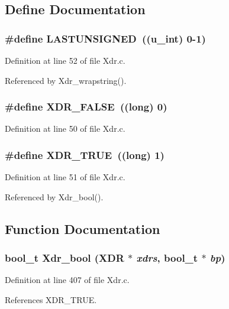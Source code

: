 \subsection{Define Documentation}
\subsubsection{\setlength{\rightskip}{0pt plus 5cm}\#define LASTUNSIGNED\ ((u\_\-int) 0-1)}\label{Xdr_8c_a2}




Definition at line 52 of file Xdr.c.

Referenced by Xdr\_\-wrapstring().
\subsubsection{\setlength{\rightskip}{0pt plus 5cm}\#define XDR\_\-FALSE\ ((long) 0)}\label{Xdr_8c_a0}




Definition at line 50 of file Xdr.c.
\subsubsection{\setlength{\rightskip}{0pt plus 5cm}\#define XDR\_\-TRUE\ ((long) 1)}\label{Xdr_8c_a1}




Definition at line 51 of file Xdr.c.

Referenced by Xdr\_\-bool().

\subsection{Function Documentation}
\subsubsection{\setlength{\rightskip}{0pt plus 5cm}bool\_\-t Xdr\_\-bool (XDR $\ast$ {\em xdrs}, bool\_\-t $\ast$ {\em bp})}\label{Xdr_8c_a18}




Definition at line 407 of file Xdr.c.

References XDR\_\-TRUE.

